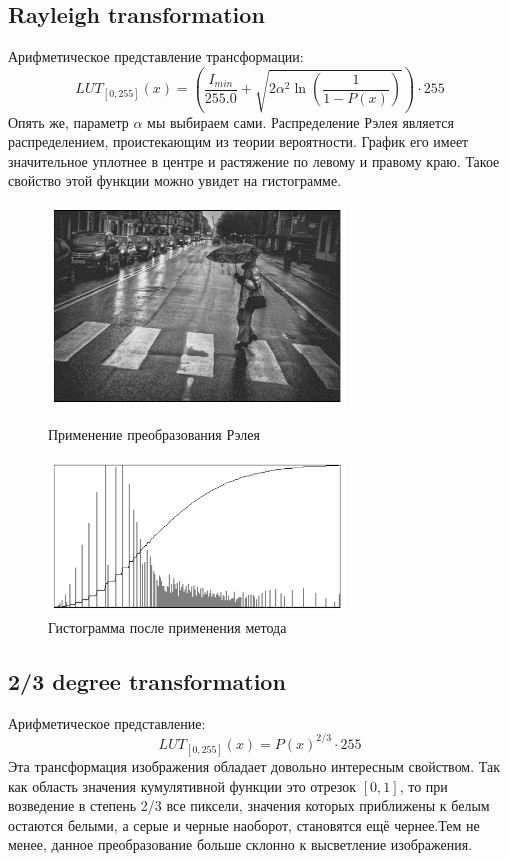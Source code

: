 \documentclass[a4paper,12pt]{article}
\begin{document}
\subsection{Rayleigh transformation}
Арифметическое представление трансформации:
$$LUT_{[0,255]}(x) = \left(\dfrac{I_{min}}{255.0}+\sqrt{2\alpha^2 \ln\left(\dfrac1{1-P(x)}\right)}\right) \cdot 255$$
Опять же, параметр $\alpha$ мы выбираем сами. Распределение Рэлея является распределением, проистекающим из теории вероятности. График его имеет значительное уплотнее в центре и растяжение по левому и правому краю. Такое свойство этой функции можно увидет на гистограмме.
\begin{figure}[H]
    \centering \includegraphics[width=0.7\textwidth]{images/ray.png}
    \caption{Применение преобразования Рэлея}
    \centering \includegraphics[width=0.7\textwidth]{images/ray_hist.png}
    \caption{Гистограмма после применения метода}
\end{figure}

\subsection{2/3 degree transformation}
Арифметическое представление:
$$LUT_{[0,255]}(x) = P(x)^{2/3} \cdot 255$$
Эта трансформация изображения обладает довольно интересным свойством. Так как область значения кумулятивной функции это отрезок $[0,1]$, то при возведение в степень  2/3 все пиксели, значения которых приближены к белым остаются белыми, а серые и черные наоборот, становятся ещё чернее.Тем не менее, данное преобразование больше склонно к высветление изображения.
\end{document}
